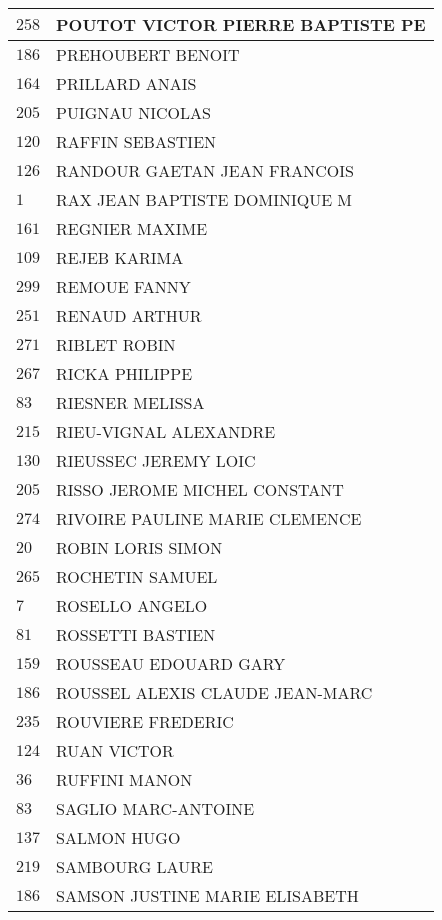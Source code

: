 \begin{xltabular}{\linewidth}{|l|X|}
    \hline
    $258$ & POUTOT VICTOR PIERRE BAPTISTE PE \\
    \hline
    $186$ & PREHOUBERT BENOIT \\
    \hline
    $164$ & PRILLARD ANAIS \\
    \hline
    $205$ & PUIGNAU NICOLAS \\
    \hline
    $120$ & RAFFIN SEBASTIEN \\
    \hline
    $126$ & RANDOUR GAETAN JEAN FRANCOIS \\
    \hline
    $1$ & RAX JEAN BAPTISTE DOMINIQUE M \\
    \hline
    $161$ & REGNIER MAXIME \\
    \hline
    $109$ & REJEB KARIMA \\
    \hline
    $299$ & REMOUE FANNY \\
    \hline
    $251$ & RENAUD ARTHUR \\
    \hline
    $271$ & RIBLET ROBIN \\
    \hline
    $267$ & RICKA PHILIPPE \\
    \hline
    $83$ & RIESNER MELISSA \\
    \hline
    $215$ & RIEU-VIGNAL ALEXANDRE \\
    \hline
    $130$ & RIEUSSEC JEREMY LOIC \\
    \hline
    $205$ & RISSO JEROME MICHEL CONSTANT \\
    \hline
    $274$ & RIVOIRE PAULINE MARIE CLEMENCE \\
    \hline
    $20$ & ROBIN LORIS SIMON \\
    \hline
    $265$ & ROCHETIN SAMUEL \\
    \hline
    $7$ & ROSELLO ANGELO \\
    \hline
    $81$ & ROSSETTI BASTIEN \\
    \hline
    $159$ & ROUSSEAU EDOUARD GARY \\
    \hline
    $186$ & ROUSSEL ALEXIS CLAUDE JEAN-MARC \\
    \hline
    $235$ & ROUVIERE FREDERIC \\
    \hline
    $124$ & RUAN VICTOR \\
    \hline
    $36$ & RUFFINI MANON \\
    \hline
    $83$ & SAGLIO MARC-ANTOINE \\
    \hline
    $137$ & SALMON HUGO \\
    \hline
    $219$ & SAMBOURG LAURE \\
    \hline
    $186$ & SAMSON JUSTINE MARIE ELISABETH \\

\end{xltabular}
